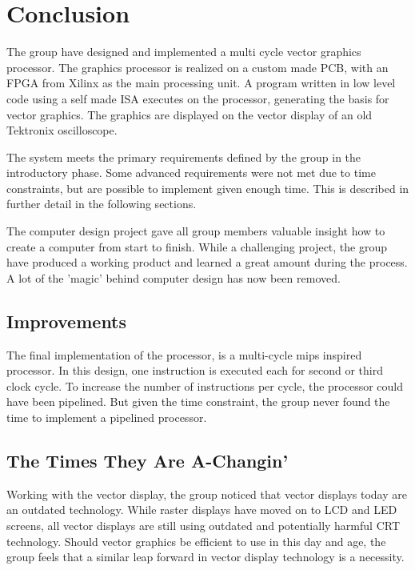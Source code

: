 \chapter{Conclusion}
The group have designed and implemented a multi cycle vector graphics processor.
The graphics processor is realized on a custom made PCB, with an FPGA from Xilinx as the main processing unit.
A program written in low level code using a self made ISA executes on the processor, generating the basis for vector graphics.
The graphics are displayed on the vector display of an old Tektronix oscilloscope.

The system meets the primary requirements defined by the group in the introductory phase. 
Some advanced requirements were not met due to time constraints, but are possible to implement given enough time. 
This is described in further detail in the following sections.

The computer design project gave all group members valuable insight how to create a computer from start to finish.
While a challenging project, the group have produced a working product and learned a great amount during the process.
A lot of the 'magic' behind computer design has now been removed.

\section{Improvements}
The final implementation of the processor, is a multi-cycle mips inspired processor.
In this design, one instruction is executed each for second or third clock cycle.
To increase the number of instructions per cycle, the processor could have been pipelined.
But given the time constraint, the group never found the time to implement a pipelined processor.

\section{The Times They Are A-Changin'}
Working with the vector display, the group noticed that vector displays today are an outdated technology. 
While raster displays have moved on to LCD and LED screens, all vector displays are still using outdated and potentially harmful CRT technology.
Should vector graphics be efficient to use in this day and age, the group feels that a similar leap forward in vector display technology is a necessity.
